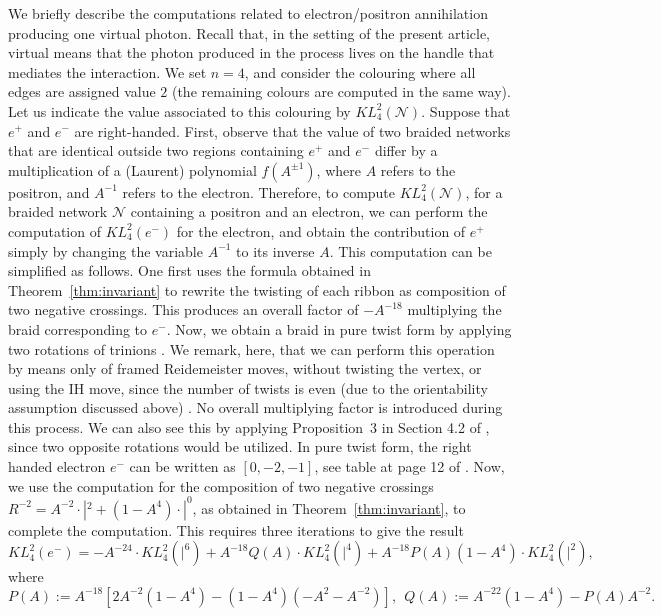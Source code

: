 \documentclass[aps,nofootinbib,amsfonts,superscriptaddress]{revtex4}
\begin{document}
We briefly describe the computations related to electron/positron annihilation producing one virtual photon. Recall that, in the setting of the present article, virtual means that the photon produced in the process lives on the handle that mediates the interaction. We set $n = 4$, and consider the colouring where all edges are assigned value $2$ (the remaining colours are computed in the same way). Let us indicate the value associated to this colouring by $KL^2_4(\mathcal N)$. Suppose that $e^+$ and $e^-$ are right-handed. First, observe that the value of two braided networks that are identical outside two regions containing $e^+$ and $e^-$ differ by a multiplication of a (Laurent) polynomial $f(A^{\pm 1})$, where $A$ refers to the positron, and $A^{-1}$ refers to the electron. Therefore, to compute $KL^2_4(\mathcal N)$, for a braided network $\mathcal N$ containing a positron and an electron, we can perform the computation of $KL^2_4(e^-)$ for the electron, and obtain the contribution of $e^+$ simply by changing the variable $A^{-1}$ to its inverse $A$. This computation can be simplified as follows. One first uses the formula obtained in Theorem~\ref{thm:invariant} to rewrite the twisting of each ribbon as composition of two negative crossings. This produces an overall factor of $-A^{-18}$ multiplying the braid corresponding to $e^-$. Now, we obtain a braid in pure twist form by applying two rotations of trinions \cite{BT2009}. We remark, here, that we can perform this operation by means only of framed Reidemeister moves, without twisting the vertex, or using the IH move, since the number of twists is even (due to the orientability assumption discussed above) \cite{Matsuzaki}. No overall multiplying factor is introduced during this process. We can also see this by applying Proposition~3 in Section 4.2 of \cite{KL}, since two opposite rotations would be utilized. In pure twist form, the right handed electron $e^-$ can be written as $[0,-2,-1]$, see table at page 12 of \cite{BT2009}. Now, we use the computation for the composition of two negative crossings $R^{-2} = A^{-2} \cdot |^2 + (1-A^4)\cdot |^0$, as obtained in Theorem~\ref{thm:invariant}, to complete the computation. This requires three iterations to give the result 
\begin{equation}\label{eqn:e-}
 KL^2_4(e^-) = -A^{-24}\cdot KL^2_4( |^6) + A^{-18}Q(A)\cdot KL^2_4(|^4) + A^{-18}P(A)(1-A^4)\cdot KL^2_4(|^2),   
\end{equation}
 where 
 \begin{equation}\label{def:PQ}
     P(A) := A^{-18}[2A^{-2}(1-A^4) - (1-A^4)(-A^2-A^{-2})],\ \  Q(A) := A^{-22}(1-A^4) - P(A)A^{-2}.
 \end{equation}
 
\end{document}
